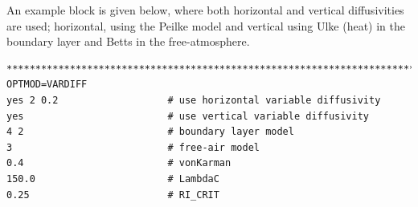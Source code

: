 An example block is given below, where both horizontal and vertical diffusivities are used; horizontal,
using the Peilke model and vertical using Ulke (heat) in the boundary layer and Betts in the free-atmosphere.

\footnotesize
\begin{verbatim}
*******************************************************************************
OPTMOD=VARDIFF
yes 2 0.2                   # use horizontal variable diffusivity
yes                         # use vertical variable diffusivity
4 2                         # boundary layer model
3                           # free-air model
0.4                         # vonKarman
150.0                       # LambdaC
0.25                        # RI_CRIT
\end{verbatim}
\normalsize



%



